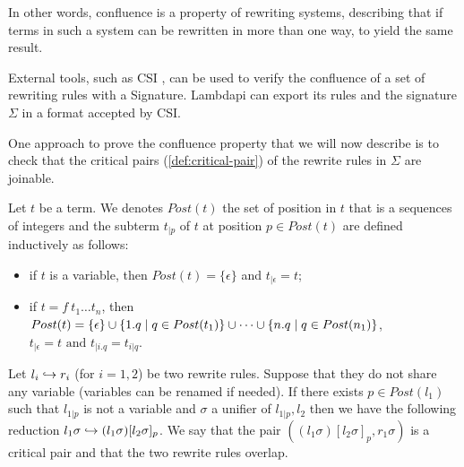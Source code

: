 In other words, confluence is a property of rewriting systems, describing that if terms in such a system can be rewritten in more than one way, to yield the same result.

\begin{remark}
External tools, such as CSI \cite{CSI}, can be used to verify the confluence of a set of rewriting rules with a Signature.
Lambdapi can export its rules and the signature $\Sigma$ in a format accepted by CSI.
\end{remark}

One approach to prove the confluence property that we will now describe is to check that the critical pairs (\cref{def:critical-pair}) of the rewrite rules in $\Sigma$ are joinable.

\begin{definition}
Let $t$ be a term. We denotes $Post(t)$ the set of position in $t$ that is a sequences of integers and the subterm $t_{| p}$ of $t$
at position $p \in Post(t)$ are defined inductively as follows:
\begin{itemize}
  \item if $t$ is a variable, then $Post(t) = \{ \epsilon \}$ and $t_{| \epsilon} = t$;
  \item if $t = f~t_1 \dots t_n$, then \( Post(t) = \{ \epsilon \} \cup \{1.q \mathrel{|} q \in Post(t_1)\} \cup \dots \cup \{n.q \mathrel{|} q \in Post(n_1)\} \),
    \( t_{| \epsilon} = t \text{ and } t_{| i.q} = t_{i|q} \).

\end{itemize}
\end{definition}

\begin{definition}\label{def:critical-pair}
Let $l_i \hookrightarrow r_i$ (for $i = 1, 2$) be two rewrite rules. Suppose that they do not share any variable (variables can be renamed if needed).
If there exists $p \in Post(l_1)$ such that $l_{1 | p}$ is not a variable and $\sigma$ a unifier of $l_{1 | p}, l_2$ then
we have the following reduction $l_1 \sigma \hookrightarrow (l_1\sigma)[l_2\sigma]_p$. We say that the pair $((l_1\sigma)[l_2\sigma]_p, r_1\sigma)$ is a
critical pair and that the two rewrite rules overlap.
\begin{center}
\end{center}
\end{definition}

